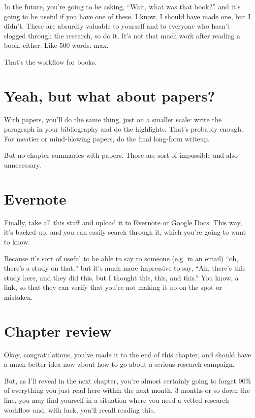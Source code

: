 In the future, you're going to be asking, ``Wait, what was that book?'' and it's
going to be useful if you have one of these. I know. I should have made one, but
I didn't. These are absurdly valuable to yourself and to everyone who hasn't
slogged through the research, so do it. It's not that much work after reading a
book, either. Like 500 words, max.

That's the workflow for books.

\section{Yeah, but what about papers?}

With papers, you'll do the same thing, just on a smaller scale: write the
paragraph in your bibliography and do the highlights. That's probably
enough. For meatier or mind-blowing papers, do the final long-form writeup.

But no chapter summaries with papers. Those are sort of impossible and also
unnecessary.

\section{Evernote}

Finally, take all this stuff and upload it to Evernote or Google Docs. This way,
it's backed up, and you can easily search through it, which you're going to want
to know.

Because it's sort of useful to be able to say to someone (e.g. in an email)
``oh, there's a study on that,'' but it's much more impressive to say, ``Ah,
there's this study here, and they did this, but I thought this, this, and
this.'' You know, a link, so that they can verify that you're not making it up
on the spot or mistaken.


\section{Chapter review}

Okay, congratulations, you've made it to the end of this chapter, and should
have a much better idea now about how to go about a serious research campaign.

But, as I'll reveal in the next chapter, you're almost certainly going to forget
90\% of everything you just read here within the next month. 3 months or so down
the line, you may find yourself in a situation where you need a vetted research
workflow and, with luck, you'll recall reading this.

